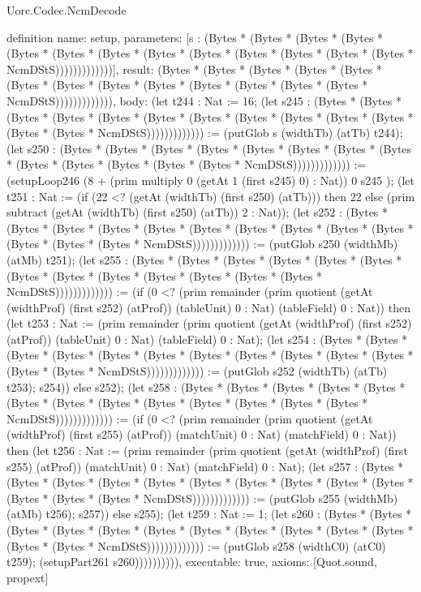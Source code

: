 \begin{lexlean}{Uorc.Codec.NcmDecode}
\begin{semanticmodule}
definition{
  name: setup,
  parameters: [s : (Bytes * (Bytes * (Bytes * (Bytes * (Bytes * (Bytes * (Bytes * (Bytes * (Bytes * (Bytes * (Bytes * (Bytes * (Bytes * NcmDStS)))))))))))))],
  result: (Bytes * (Bytes * (Bytes * (Bytes * (Bytes * (Bytes * (Bytes * (Bytes * (Bytes * (Bytes * (Bytes * (Bytes * (Bytes * NcmDStS))))))))))))),
  body: (let t244 : Nat := 16; (let s245 : (Bytes * (Bytes * (Bytes * (Bytes * (Bytes * (Bytes * (Bytes * (Bytes * (Bytes * (Bytes * (Bytes * (Bytes * (Bytes * NcmDStS))))))))))))) := (putGlob s (widthTb) (atTb) t244); (let s250 : (Bytes * (Bytes * (Bytes * (Bytes * (Bytes * (Bytes * (Bytes * (Bytes * (Bytes * (Bytes * (Bytes * (Bytes * (Bytes * NcmDStS))))))))))))) := (setupLoop246 (8 + (prim multiply 0 (getAt 1 (first s245) 0) : Nat)) 0 s245 ); (let t251 : Nat := (if (22 <? (getAt (widthTb) (first s250) (atTb))) then 22 else (prim subtract (getAt (widthTb) (first s250) (atTb)) 2 : Nat)); (let s252 : (Bytes * (Bytes * (Bytes * (Bytes * (Bytes * (Bytes * (Bytes * (Bytes * (Bytes * (Bytes * (Bytes * (Bytes * (Bytes * NcmDStS))))))))))))) := (putGlob s250 (widthMb) (atMb) t251); (let s255 : (Bytes * (Bytes * (Bytes * (Bytes * (Bytes * (Bytes * (Bytes * (Bytes * (Bytes * (Bytes * (Bytes * (Bytes * (Bytes * NcmDStS))))))))))))) := (if (0 <? (prim remainder (prim quotient (getAt (widthProf) (first s252) (atProf)) (tableUnit) 0 : Nat) (tableField) 0 : Nat)) then (let t253 : Nat := (prim remainder (prim quotient (getAt (widthProf) (first s252) (atProf)) (tableUnit) 0 : Nat) (tableField) 0 : Nat); (let s254 : (Bytes * (Bytes * (Bytes * (Bytes * (Bytes * (Bytes * (Bytes * (Bytes * (Bytes * (Bytes * (Bytes * (Bytes * (Bytes * NcmDStS))))))))))))) := (putGlob s252 (widthTb) (atTb) t253); s254)) else s252); (let s258 : (Bytes * (Bytes * (Bytes * (Bytes * (Bytes * (Bytes * (Bytes * (Bytes * (Bytes * (Bytes * (Bytes * (Bytes * (Bytes * NcmDStS))))))))))))) := (if (0 <? (prim remainder (prim quotient (getAt (widthProf) (first s255) (atProf)) (matchUnit) 0 : Nat) (matchField) 0 : Nat)) then (let t256 : Nat := (prim remainder (prim quotient (getAt (widthProf) (first s255) (atProf)) (matchUnit) 0 : Nat) (matchField) 0 : Nat); (let s257 : (Bytes * (Bytes * (Bytes * (Bytes * (Bytes * (Bytes * (Bytes * (Bytes * (Bytes * (Bytes * (Bytes * (Bytes * (Bytes * NcmDStS))))))))))))) := (putGlob s255 (widthMb) (atMb) t256); s257)) else s255); (let t259 : Nat := 1; (let s260 : (Bytes * (Bytes * (Bytes * (Bytes * (Bytes * (Bytes * (Bytes * (Bytes * (Bytes * (Bytes * (Bytes * (Bytes * (Bytes * NcmDStS))))))))))))) := (putGlob s258 (widthC0) (atC0) t259); (setupPart261 s260)))))))))),
  executable: true,
  axioms: [Quot.sound, propext]
}


\end{semanticmodule}
\end{lexlean}
